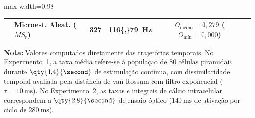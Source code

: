 \begin{table}[tbp]
\begin{adjustbox}{max width=0.98\textwidth}
\begin{tabular}{llcccc}
                                               & Microest. Aleat. ($MS_r$)  & 327                      & \qty{116{,}79}{\hertz} & $O_{\text{médio}} = 0{,}279$ ($O_{\text{mín}} = 0{,}000$) & \\
            \bottomrule
        \end{tabular}
    \end{adjustbox}
    \vspace{0.2em}
    \begin{minipage}{0.98\textwidth}
        \footnotesize \textbf{Nota:} Valores computados diretamente das trajetórias temporais. No Experimento~1, a taxa média refere-se à população de 80 células piramidais durante $\qty{1{,}4}{\second}$ de estimulação contínua, com dissimilaridade temporal avaliada pela distância de van Rossum com filtro exponencial ($\tau = \qty{10}{\milli\second}$). No Experimento~2, as taxas e integrais de cálcio intracelular correspondem a $\qty{2{,}8}{\second}$ de ensaio óptico ($\qty{140}{\milli\second}$ de ativação por ciclo de $\qty{280}{\milli\second}$).
    \end{minipage}
\end{table}
